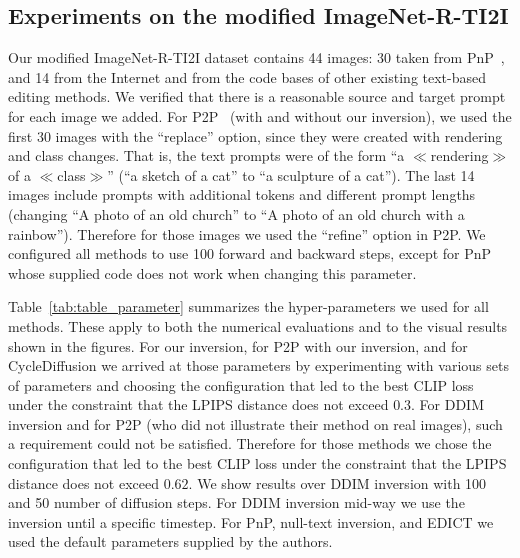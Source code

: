 \subsection{Experiments on the modified ImageNet-R-TI2I}\label{app:ImageNet-Dataset}
Our modified ImageNet-R-TI2I dataset contains 44 images: 30 taken from PnP~\cite{Narek22}, and 14 from the Internet and from the code bases of other existing text-based editing methods. We verified that there is a reasonable source and target prompt for each image we added. For P2P~\cite{Hertz22} (with and without our inversion), we used the first 30 images with the ``replace'' option, since they were created with rendering and class changes. That is, the text prompts were of the form ``a $\ll$rendering$\gg$ of a $\ll$class$\gg$'' (\eg ``a sketch of a cat'' to ``a sculpture of a cat''). The last 14 images include prompts with additional tokens and different prompt lengths (\eg changing ``A photo of an old church'' to ``A photo of an old church with a rainbow''). Therefore for those images we used the ``refine'' option in P2P. We configured all methods to use 100 forward and backward steps, except for PnP whose supplied code does not work when changing this parameter. 

Table~\ref{tab:table_parameter} summarizes the hyper-parameters we used for all methods. These apply to both the numerical evaluations and to the visual results shown in the figures. For our inversion, for P2P with our inversion, and for CycleDiffusion we arrived at those parameters by experimenting with various sets of parameters and choosing the configuration that led to the best CLIP loss under the constraint that the LPIPS distance does not exceed $0.3$. For DDIM inversion and for P2P (who did not illustrate their method on real images), such a requirement could not be satisfied. Therefore for those methods we chose the configuration that led to the best CLIP loss under the constraint that the LPIPS distance does not exceed $0.62$. We show results over DDIM inversion with 100 and 50 number of diffusion steps. For DDIM inversion mid-way we use the inversion until a specific timestep. For PnP, null-text inversion, and EDICT we used the default parameters supplied by the authors.



